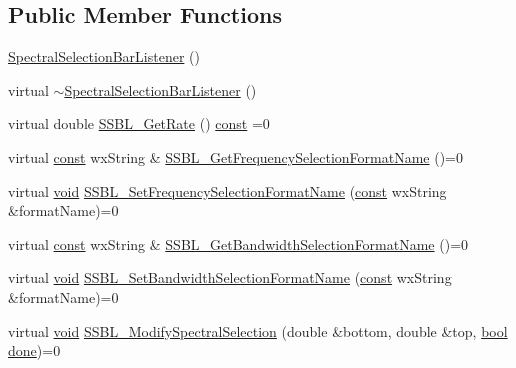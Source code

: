 \subsection*{Public Member Functions}
\begin{DoxyCompactItemize}
\item 
\hyperlink{class_spectral_selection_bar_listener_ae447a5a85c789210458d944c13a9cd62}{Spectral\+Selection\+Bar\+Listener} ()
\item 
virtual \hyperlink{class_spectral_selection_bar_listener_a7e2267a556bc65afc0c219f437f77f75}{$\sim$\+Spectral\+Selection\+Bar\+Listener} ()
\item 
virtual double \hyperlink{class_spectral_selection_bar_listener_a5144a7dd3a5fa89352719aba714ab24b}{S\+S\+B\+L\+\_\+\+Get\+Rate} () \hyperlink{getopt1_8c_a2c212835823e3c54a8ab6d95c652660e}{const}  =0
\item 
virtual \hyperlink{getopt1_8c_a2c212835823e3c54a8ab6d95c652660e}{const} wx\+String \& \hyperlink{class_spectral_selection_bar_listener_af47b50ba232d8d7115e6c3a0ca72268b}{S\+S\+B\+L\+\_\+\+Get\+Frequency\+Selection\+Format\+Name} ()=0
\item 
virtual \hyperlink{sound_8c_ae35f5844602719cf66324f4de2a658b3}{void} \hyperlink{class_spectral_selection_bar_listener_a890a70f3edbb81a1fd1387aa2dcdd6d1}{S\+S\+B\+L\+\_\+\+Set\+Frequency\+Selection\+Format\+Name} (\hyperlink{getopt1_8c_a2c212835823e3c54a8ab6d95c652660e}{const} wx\+String \&format\+Name)=0
\item 
virtual \hyperlink{getopt1_8c_a2c212835823e3c54a8ab6d95c652660e}{const} wx\+String \& \hyperlink{class_spectral_selection_bar_listener_aa8140f915dc9e52cd7e896e76429e1f8}{S\+S\+B\+L\+\_\+\+Get\+Bandwidth\+Selection\+Format\+Name} ()=0
\item 
virtual \hyperlink{sound_8c_ae35f5844602719cf66324f4de2a658b3}{void} \hyperlink{class_spectral_selection_bar_listener_a8454afe29eaf53360f450f8675426553}{S\+S\+B\+L\+\_\+\+Set\+Bandwidth\+Selection\+Format\+Name} (\hyperlink{getopt1_8c_a2c212835823e3c54a8ab6d95c652660e}{const} wx\+String \&format\+Name)=0
\item 
virtual \hyperlink{sound_8c_ae35f5844602719cf66324f4de2a658b3}{void} \hyperlink{class_spectral_selection_bar_listener_a937bdb9cec10f4e9a35274524db23903}{S\+S\+B\+L\+\_\+\+Modify\+Spectral\+Selection} (double \&bottom, double \&top, \hyperlink{mac_2config_2i386_2lib-src_2libsoxr_2soxr-config_8h_abb452686968e48b67397da5f97445f5b}{bool} \hyperlink{mm_8c_a5f689029e53f12e337967312e0a17717}{done})=0
\end{DoxyCompactItemize}


